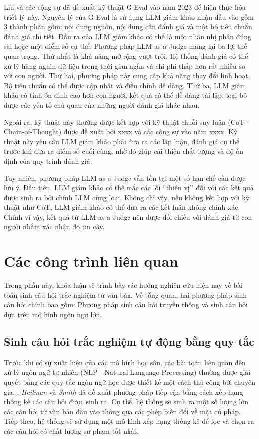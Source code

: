  Liu và các cộng sự đã đề xuất kỹ thuật G-Eval vào năm 2023 để hiện thực hóa  triết lý này. Nguyên lý của G-Eval là sử dụng LLM giám khảo nhận đầu vào gồm 3 thành phần gồm: nội dung nguồn, nội dung cần đánh giá và một bộ tiêu chuẩn đánh giá chi tiết. Đầu ra của LLM giảm khảo có thể là một nhãn nhị phân đúng sai hoặc một điểm số cụ thể. Phương pháp LLM-as-a-Judge mang lại ba lợi thế quan trọng. Thứ nhất là khả năng mở rộng vượt trội. Hệ thống đánh giá có thể xử lý hàng nghìn dữ liệu trong thời gian ngắn và chi phí thấp hơn rất nhiều so với con người. Thứ hai, phương pháp này cung cấp khả năng thay đổi linh hoạt. Bộ tiêu chuẩn có thể được cập nhật và điều chỉnh dễ dàng. Thứ ba, LLM giám khảo có tính ổn định cao hơn con người, kết quả có thể dễ dàng tái lập, loại bỏ được các yếu tố chủ quan của những người đánh giá khác nhau.

Ngoài ra, kỹ thuật này thường được kết hợp với kỹ thuật chuỗi suy luận (CoT - Chain-of-Thought) \cite{} được đề xuất bởi xxxx và các cộng sự vào năm xxxx. Kỹ thuật này yêu cầu LLM giám khảo phải đưa ra các lập luận, đánh giá cụ thể trước khi đưa ra điểm số cuối cùng, nhờ đó giúp cải thiện chất lượng và độ ổn định của quy trình đánh giá.

Tuy nhiên, phương pháp LLM-as-a-Judge vẫn tồn tại một số hạn chế cần được lưu ý. Đầu tiên, LLM giám khảo có thế mắc các lỗi ``thiên vị’’ đối với các kết quả được sinh ra bởi chính LLM cùng loại. Không chỉ vậy, nếu không kết hợp với kỹ thuật như CoT, LLM giám khảo có thể đưa ra các kết luận không chính xác. Chính vì vậy, kết quả từ LLM-as-a-Judge nên được đối chiếu với đánh giá từ con người nhằm xác nhận độ tin cậy.

\section{Các công trình liên quan}

Trong phần này, khóa luận sẽ trình bày các hướng nghiên cứu hiện nay về bài toán sinh câu hỏi trắc nghiệm từ văn bản. Về tổng quan, hai phương pháp sinh câu hỏi chính bao gồm: Phương pháp sinh câu hỏi truyền thống và sinh câu hỏi dựa trên mô hình ngôn ngữ lớn.

\subsection{Sinh câu hỏi trắc nghiệm tự động bằng quy tắc}

Trước khi có sự xuất hiện của các mô hình học sâu, các bài toán liên quan đến xử lý ngôn ngữ tự nhiên (NLP - Natural Language Processing)  thường được giải quyết bằng các quy tắc ngôn ngữ học được thiết kế một cách thủ công bởi chuyên gia. . \textit{Heilman} và \textit{Smith} \cite{heilman2010good} đã đề xuất phương pháp tiếp cận bằng cách xếp hạng thống kế các câu hỏi được sinh ra. Cụ thể, hệ thống sẽ sinh ra một số lượng lớn các câu hỏi từ văn bản đầu vào thông qua các phép biến đổi về mặt cú pháp. Tiếp theo, hệ thống sẽ sử dụng một mô hình xếp hạng thống kê để lọc và chọn ra các câu hỏi có chất lượng sư phạm tốt nhất.

